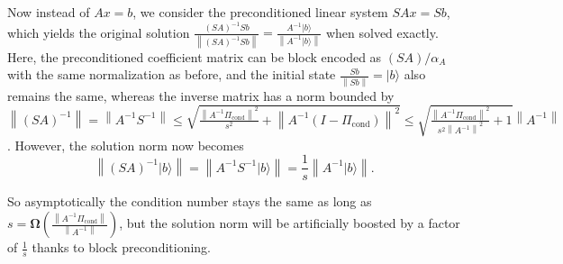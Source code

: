 \documentclass[letterpaper,onecolumn,11pt,accepted=2026-02-14]{quantumarticle}
\newcommand{\norm}[1]{\left\lVert#1\right\rVert}
\theoremstyle{remark}
\theoremstyle{plain}
\newcommand{\ket}[1]{|#1\rangle}
\begin{document}
Now instead of $Ax=b$, we consider the preconditioned linear system $SAx=Sb$,
which yields the original solution $\frac{(SA)^{-1}Sb}{\norm{(SA)^{-1}Sb}}=\frac{A^{-1}\ket{b}}{\norm{A^{-1}\ket{b}}}$ when solved exactly.
Here, the preconditioned coefficient matrix can be block encoded as $(SA)/\alpha_A$ with the same normalization as before, and the initial state $\frac{Sb}{\norm{Sb}}=\ket{b}$ also remains the same, whereas the inverse matrix has a norm bounded by $\norm{(SA)^{-1}}
    =\norm{A^{-1}S^{-1}}
    \leq\sqrt{\frac{\norm{A^{-1}\Pi_{\text{cond}}}^2}{s^2}+\norm{A^{-1}\left(I-\Pi_{\text{cond}}\right)}^2}
    \leq\sqrt{\frac{\norm{A^{-1}\Pi_{\text{cond}}}^2}{s^2\norm{A^{-1}}^2}+1}\norm{A^{-1}}$.
However, the solution norm now becomes
\begin{equation}
    \norm{(SA)^{-1}\ket{b}}
    =\norm{A^{-1}S^{-1}\ket{b}}
    =\frac{1}{s}\norm{A^{-1}\ket{b}}.
\end{equation}
\addtocounter{equation}{1}%
So asymptotically the condition number stays the same as long as $s=\mathbf{\Omega}\left(\frac{\norm{A^{-1}\Pi_{\text{cond}}}}{\norm{A^{-1}}}\right)$,
but the solution norm will be artificially boosted by a factor of $\frac{1}{s}$ thanks to block preconditioning.
\end{document}
